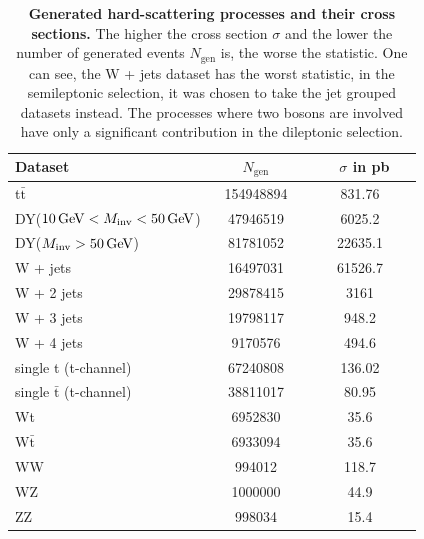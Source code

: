 \begin{table}[t]
\caption[Hard-Scattering Processes]{\textbf{Generated hard-scattering processes and their cross sections.} The higher the cross section $\sigma$ and the lower the number of generated events $N_{\textrm{gen}}$ is, the worse the statistic. One can see, the W + jets dataset has the worst statistic, in the semileptonic selection, it was chosen to take the jet grouped datasets instead. The processes where two bosons are involved have only a significant contribution in the dileptonic selection.}
\label{tab:ch_6_Datasets}
\begin{tabular}{lS[table-number-alignment = right]
					S[table-number-alignment = center,table-figures-decimal = 2]}
\toprule
{Dataset $\qquad$} & {$\qquad N_{\textrm{gen}}\qquad$} & {$\qquad\sigma$ in pb $\quad$} \\ 
\midrule
t$\bar{\textrm{t}}$ & 154948894 & 831.76 \cite{TopPP}\\
DY($10\,\mathrm{GeV} < M_\textrm{inv} < 50\,\mathrm{GeV}$) & 47946519 & 6025.2 \cite{DYCrossSec}\\
DY($M_\textrm{inv} > 50\,\mathrm{GeV}$) & 81781052 & 22635.1 \cite{DYCrossSec}\\
W + jets & 16497031 & 61526.7 \cite{DYCrossSec}\\
W + 2 jets & 29878415 & 3161 \cite{GenXSec}\\
W + 3 jets & 19798117 & 948.2 \cite{GenXSec} \\
W + 4 jets & 9170576 & 494.6 \cite{GenXSec}\\
single t (t-channel) & 67240808 & 136.02 \cite{HatHor1,HatHor2}\\
single $\bar{\textrm{t}}$ (t-channel) & 38811017 & 80.95 \cite{HatHor1,HatHor2}\\
Wt & 6952830 & 35.6 \cite{HatHor1,HatHor2}\\
W$\bar{\textrm{t}}$ & 6933094 & 35.6 \cite{HatHor1,HatHor2}\\
WW & 994012 & 118.7 \cite{BosonPairCrossSec}\\
WZ & 1000000 & 44.9 \cite{BosonPairCrossSec}\\
ZZ & 998034 & 15.4 \cite{BosonPairCrossSec}\\
\bottomrule
\end{tabular}
\end{table}

